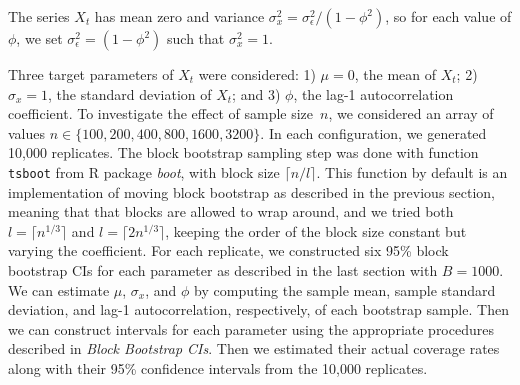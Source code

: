 \documentclass[10pt]{article}
\begin{document}
 The 
series $X_t$ has mean zero and variance 
$\sigma_x^2 = \sigma_{\epsilon}^2 / (1 - \phi^2)$, so for each value of $\phi$, 
we 
set $\sigma_{\epsilon}^2 = (1 - \phi^2)$ such that $\sigma_x^2 = 1$.


Three target parameters of $X_t$ were considered:
1) $\mu = 0$, the mean of $X_t$;
2) $\sigma_x = 1$, the standard deviation of $X_t$; and
3) $\phi$, the lag-1 autocorrelation coefficient.
To investigate the effect of sample size~$n$, we considered an array of values
$n \in \{100, 200, 400, 800, 1600, 3200\}$. In each configuration, we generated 
10,000 replicates. The 
block bootstrap sampling step was done with function \texttt{tsboot} from R 
\citep{R}
package \textsl{boot},\citep{boot} with block size $\lceil n / l \rceil$. This 
function by default is an implementation of moving block bootstrap as described 
in the previous section, meaning that that blocks are allowed to wrap around, 
and we tried both $l = \lceil n^{1/3} \rceil$ and $l = \lceil 2n^{1/3} \rceil$,
keeping the order of the block size constant but varying the coefficient. 
For each replicate, we constructed 
six 95\% block bootstrap 
CIs for each parameter as described in the last section with $B = 1000$. We can
estimate $\mu$, $\sigma_x$, and $\phi$ by computing the sample mean,
sample standard deviation, 
and lag-1 autocorrelation, respectively, of each bootstrap sample. Then we can 
construct intervals for each parameter using the appropriate procedures 
described in \textit{Block Bootstrap CIs}. 
Then we estimated their actual coverage 
rates along with their 95\% confidence intervals from the 10,000 replicates. 
\end{document}
